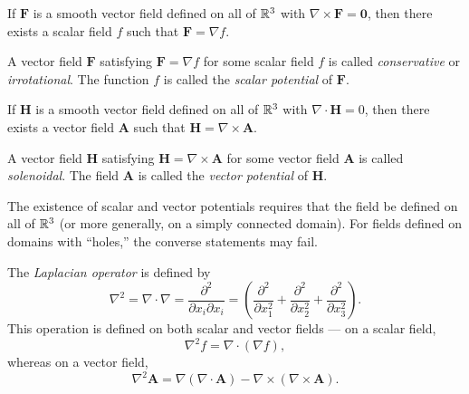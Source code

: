 \documentclass[a4paper]{article}
\begin{document}
\begin{prop}
  If $\mathbf{F}$ is a smooth vector field defined on all of $\mathbb{R}^3$ with $\nabla\times \mathbf{F} = \mathbf{0}$, then there exists a scalar field $f$ such that $\mathbf{F} = \nabla f$.
\end{prop}

\begin{defi}
  A vector field $\mathbf{F}$ satisfying $\mathbf{F} = \nabla f$ for some scalar field $f$ is called \emph{conservative} or \emph{irrotational}. The function $f$ is called the \emph{scalar potential} of $\mathbf{F}$.
\end{defi}

\begin{prop}
  If $\mathbf{H}$ is a smooth vector field defined on all of $\mathbb{R}^3$ with $\nabla\cdot \mathbf{H} = 0$, then there exists a vector field $\mathbf{A}$ such that $\mathbf{H} = \nabla \times \mathbf{A}$.
\end{prop}

\begin{defi}
  A vector field $\mathbf{H}$ satisfying $\mathbf{H} = \nabla \times \mathbf{A}$ for some vector field $\mathbf{A}$ is called \emph{solenoidal}. The field $\mathbf{A}$ is called the \emph{vector potential} of $\mathbf{H}$.
\end{defi}

\begin{rmk}
  The existence of scalar and vector potentials requires that the field be defined on all of $\mathbb{R}^3$ (or more generally, on a simply connected domain). For fields defined on domains with ``holes,'' the converse statements may fail.
\end{rmk}

\begin{defi}
  The \emph{Laplacian operator} is defined by
  \[
    \nabla^2 = \nabla\cdot \nabla = \frac{\partial^2}{\partial x_i \partial x_i} = \left(\frac{\partial^2}{\partial x_1^2} + \frac{\partial^2}{\partial x_2^2} + \frac{\partial^2}{\partial x_3^2}\right).
  \]
  This operation is defined on both scalar and vector fields --- on a scalar field,
  \[
    \nabla^2 f = \nabla\cdot (\nabla f),
  \]
  whereas on a vector field,
  \[
    \nabla^2 \mathbf{A} = \nabla(\nabla\cdot \mathbf{A}) - \nabla\times (\nabla\times \mathbf{A}).
  \]
\end{defi}
\end{document}
